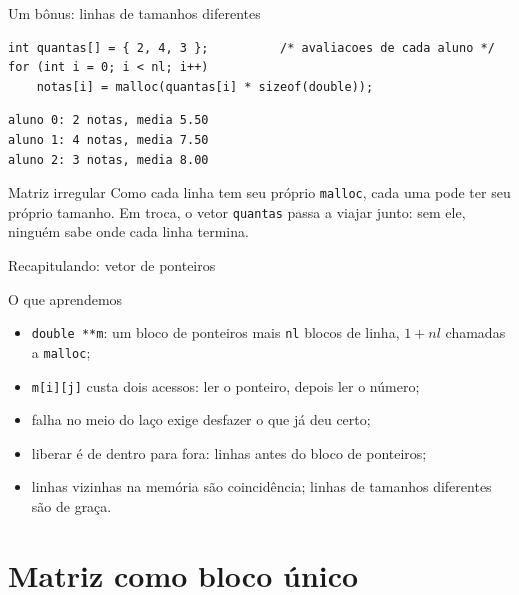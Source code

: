 \documentclass[aspectratio=169]{beamer}
\begin{document}
\begin{frame}[fragile]{Um bônus: linhas de tamanhos diferentes}
\begin{lstlisting}[basicstyle=\ttfamily\scriptsize, numbers=none]
int quantas[] = { 2, 4, 3 };          /* avaliacoes de cada aluno */
for (int i = 0; i < nl; i++)
    notas[i] = malloc(quantas[i] * sizeof(double));
\end{lstlisting}
\begin{lstlisting}[basicstyle=\ttfamily\scriptsize, numbers=none, language=bash]
aluno 0: 2 notas, media 5.50
aluno 1: 4 notas, media 7.50
aluno 2: 3 notas, media 8.00
\end{lstlisting}
  \begin{block}{Matriz irregular}
    Como cada linha tem seu próprio \texttt{malloc}, cada uma pode ter seu
    próprio tamanho. Em troca, o vetor \texttt{quantas} passa a viajar junto:
    sem ele, ninguém sabe onde cada linha termina.
  \end{block}
\end{frame}

\begin{frame}{Recapitulando: vetor de ponteiros}
  \begin{block}{O que aprendemos}
    \begin{itemize}
      \item \texttt{double **m}: um bloco de ponteiros mais \texttt{nl} blocos
        de linha, $1 + nl$ chamadas a \texttt{malloc};
      \item \texttt{m[i][j]} custa dois acessos: ler o ponteiro, depois ler o
        número;
      \item falha no meio do laço exige desfazer o que já deu certo;
      \item liberar é de dentro para fora: linhas antes do bloco de ponteiros;
      \item linhas vizinhas na memória são coincidência; linhas de tamanhos
        diferentes são de graça.
    \end{itemize}
  \end{block}
\end{frame}

\section{Matriz como bloco único}
\end{document}
